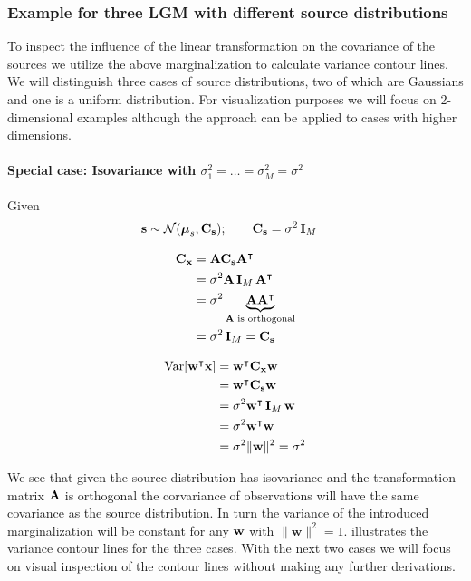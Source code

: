 \subsubsection{Example for three LGM with different source distributions}
To inspect the influence of the linear transformation on the covariance of the sources we utilize the above 
marginalization to calculate variance contour lines. We will distinguish three cases of source distributions,
two of which are Gaussians and one is a uniform distribution. For visualization purposes we will focus on 2-dimensional
examples although the approach can be applied to cases with higher dimensions.

\paragraph{Special case: Isovariance with $\sigma_1^2 = \dots = \sigma_M^2 = \sigma^2$}
\label{par:cov_isovar}
\qquad \newline
Given
	\begin{align*}
		\mathbf{s} \sim \mathcal{N}(\mathbf{\boldsymbol \mu}_s,\mathbf{C_s}); \qquad
		\mathbf{C_s} &= \sigma^2 \operatorname{\mathbf{I}}_M &
	\end{align*}
	
\begin{minipage}{0.45\textwidth}
\begin{align*}
	\mathbf{C_x} &= \mathbf{A C_s A^\intercal} \\
	             &= \sigma^2 \mathbf{A} \operatorname{\mathbf{I}}_M \mathbf{A}^\intercal \\
	             &= \sigma^2 \underbrace{\mathbf{A}\mathbf{A}^\intercal}_{\mathbf{A}\text{ is orthogonal}} \\
	             &= \sigma^2 \operatorname{\mathbf{I}}_M = \mathbf{C_s} \\
\end{align*}
\end{minipage}
\begin{minipage}{0.45\textwidth}
\begin{align*}
	\mathrm{Var}[\mathbf{w^\intercal x}] &= \mathbf{w^\intercal C_x w} \\
				    &= \mathbf{w^\intercal C_s w} \\
	                &= \sigma^2 \mathbf{w}^\intercal \operatorname{\mathbf{I}}_M \mathbf{w} \\
	                &= \sigma^2 \mathbf{w}^\intercal \mathbf{w} \\
	                &= \sigma^2 \|\mathbf{w}\|^2 = \sigma^2 \\
\end{align*}
\end{minipage}
\newline
We see that given the source distribution has isovariance and the transformation matrix $\mathbf{A}$ is orthogonal
the corvariance of observations will have the same covariance as the source distribution. In turn the variance
of the introduced marginalization will be constant for any $\mathbf{w}$ with $\|\mathbf{w}\|^2 = 1$. 
 illustrates the variance contour lines for the three cases.
With the next two cases we will focus on visual inspection of the contour lines without making any further
derivations.


